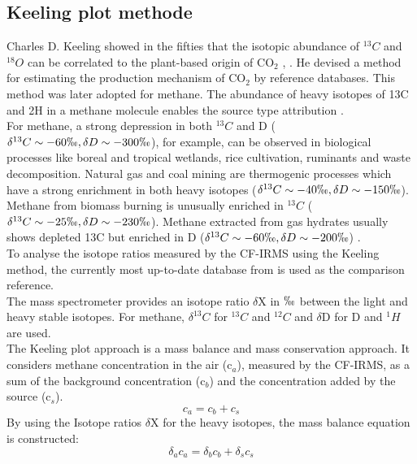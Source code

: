 \subsection{Keeling plot methode}
Charles D. Keeling showed in the fifties that the isotopic abundance of $ ^{13}C$ and $^{18}O$ can be correlated to the plant-based origin of CO$_2$ \cite{CharlesDKeeling.1958}, \cite{CharlesDKeeling.1960}. He devised a method for estimating the production mechanism of CO$_2$ by reference databases. This method was later adopted for methane. The abundance of heavy isotopes of 13C and 2H in a methane molecule enables the source type attribution \cite{Menoud.2021} \cite{Menoud.2022b}.\\
For methane, a strong depression in both $^{13}C$ and D ($\delta ^{13}C \sim {-60} \permil,  \delta D \sim {-300} \permil$), for example, can be observed in biological processes like boreal and tropical wetlands, rice cultivation, ruminants and waste decomposition. Natural gas and coal mining are thermogenic processes which have a strong enrichment in both heavy isotopes ($\delta ^{13}C\sim {-40}\permil,  \delta D\sim {-150}\permil$). Methane from biomass burning is unusually enriched in $^{13}C$ ($\delta ^{13}C\sim {-25}\permil,  \delta D\sim {-230}\permil$). Methane extracted from gas hydrates usually shows depleted 13C but enriched in D ($\delta ^{13}C\sim {-60}\permil,  \delta D\sim {-200}\permil$) \cite{Brass.2010}.\\
To analyse the isotope ratios measured by the CF-IRMS using the Keeling method, the currently most up-to-date database from \cite{Menoud.2022} is used as the comparison reference.\\
The mass spectrometer provides an isotope ratio $\delta$X in $\permil$ between the light and heavy stable isotopes. For methane, $\delta ^{13}C$ for $^{13}C$ and $^{12}C$ and $\delta$D for D and $^{1}H$ are used.\\
The Keeling plot approach is a mass balance and mass conservation approach. It considers methane concentration in the air (c$_a$), measured by the CF-IRMS, as a sum of the background concentration (c$_b$) and the concentration added by the source (c$_s$).
\begin{equation}\label{massconservation}
c_a = c_b + c_s
\end{equation}
By using the Isotope ratios $\delta$X for the heavy isotopes, the mass balance equation is constructed:
\begin{equation}\label{massbalance}
\delta_a c_a = \delta_b c_b + \delta_s c_s
\end{equation}
